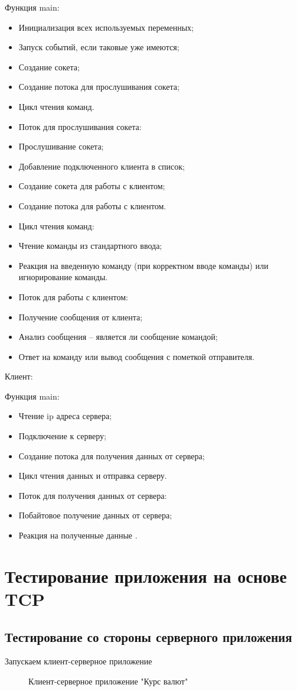 \documentclass[a4paper,14pt]{article}
\begin{document}
Функция main:
	\begin{itemize}		
\item Инициализация всех используемых переменных;
\item Запуск событий, если таковые уже имеются;
\item Создание сокета;
\item Создание потока для прослушивания сокета;
\item Цикл чтения команд.
\item Поток для прослушивания сокета:
\item Прослушивание сокета;
\item Добавление подключенного клиента в список;
\item Создание сокета для работы с клиентом;
\item Создание потока для работы с клиентом.
\item Цикл чтения команд:
\item Чтение команды из стандартного ввода;
\item Реакция на введенную команду (при корректном вводе команды) или игнорирование команды.
\item Поток для работы с клиентом:
\item Получение сообщения от клиента;
\item Анализ сообщения – является ли сообщение командой;
\item Ответ на команду или вывод сообщения с пометкой отправителя.
\end{itemize}
Клиент:

Функция main:
	\begin{itemize}	
\item Чтение ip адреса сервера;
\item Подключение к серверу;
\item Создание потока для получения данных от сервера;
\item Цикл чтения данных и отправка серверу.
\item Поток для получения данных от сервера:
\item Побайтовое получение данных от сервера;
\item Реакция на полученные данные .
	\end{itemize}
\section{Тестирование приложения на основе TCP}
\subsection{Тестирование со стороны серверного приложения}
Запускаем клиент-серверное приложение
\begin{figure}[h!]
	\noindent\centering{
		\texttt{[image: 1]}}
	\caption{Клиент-серверное приложение "Курс валют"}
	\label{figCurves}
\end{figure}
\end{document}

